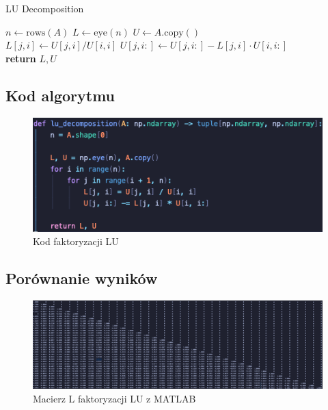 \documentclass{article}
\begin{document}
\begin{algorithm}
\caption{LU Decomposition}
\begin{algorithmic}[1]
    \State $n \gets \text{rows}(A)$
    \State $L \gets \text{eye}(n)$
    \State $U \gets A.\text{copy}()$
    \\
            \State $L[j, i] \gets U[j, i] / U[i, i]$
            \State $U[j, i:] \gets U[j, i:] - L[j, i] \cdot U[i, i:]$
        \EndFor
    \EndFor
    \\
    \State \textbf{return} $L, U$
\EndProcedure
\end{algorithmic}
\end{algorithm}

\subsection{Kod algorytmu}

\begin{figure}[htbp]
  \centering
  \includegraphics[width=0.9\linewidth]{lu.png}
  \caption{Kod faktoryzacji LU}
  \label{fig:lu}
\end{figure}

\subsection{Porównanie wyników}

\begin{figure}[htbp]
  \centering
  \includegraphics[width=\linewidth]{l_matlab.png}
  \caption{Macierz L faktoryzacji LU z MATLAB}
  \label{fig:l_matlab}
\end{figure}
\end{document}
